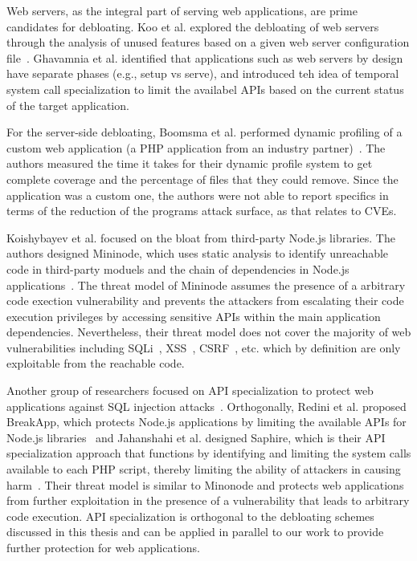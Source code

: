 Web servers, as the integral part of serving web applications, are prime candidates for debloating. 
Koo et al. explored the debloating of web servers through the analysis of unused features based on a given web server configuration file~\cite{koo2019configuration}. 
Ghavamnia et al. identified that applications such as web servers by design have separate phases (e.g., setup vs serve), and introduced teh idea of temporal system call specialization to limit the availabel APIs based on the current status of the target application. 

For the server-side debloating, Boomsma et al. performed dynamic profiling of a custom web application (a PHP application from an industry partner)~\cite{boomsma2012Dead}. 
The authors measured the time it takes for their dynamic profile system to get
complete coverage and the percentage of files that they could remove. Since the
application was a custom one, the authors were not able to report specifics
in terms of the reduction of the programs attack surface, as that relates
to CVEs. 

Koishybayev et al. focused on the bloat from third-party Node.js libraries. 
The authors designed Mininode, which uses static analysis to identify unreachable code in third-party moduels and the chain of dependencies in Node.js applications~\cite{mininode}. 
The threat model of Mininode assumes the presence of a arbitrary code exection vulnerability and prevents the attackers from escalating their code execution privileges by accessing sensitive APIs within the main application dependencies. 
Nevertheless, their threat model does not cover the majority of web vulnerabilities including SQLi~\cite{sqlInjection}, XSS~\cite{xss}, CSRF~\cite{csrf}, etc. which by definition are only exploitable from the reachable code. 

Another group of researchers focused on API specialization to protect web applications against SQL injection attacks~\cite{jahanshahi2020you}.
Orthogonally, Redini et al. proposed BreakApp, which protects Node.js applications by limiting the available APIs for Node.js libraries~\cite{vasilakis2018breakapp} and Jahanshahi et al. designed Saphire, which is their API specialization approach that functions by identifying and limiting the system calls available to each PHP script, thereby limiting the ability of attackers in causing harm~\cite{saphire}. 
Their threat model is similar to Minonode and protects web applications from further exploitation in the presence of a vulnerability that leads to arbitrary code execution. 
API specialization is orthogonal to the debloating schemes discussed in this thesis and can be applied in parallel to our work to provide further protection for web applications. 


